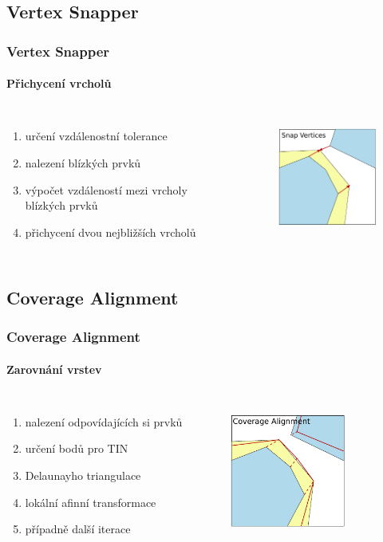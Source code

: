 \documentclass[unicode,bookmarksnumbered]{beamer}
\begin{document}
  \subsection{Vertex Snapper}  %
  \begin{frame}
  \frametitle{Vertex Snapper}
    \framesubtitle{Přichycení vrcholů}
    \begin{columns}[c]
	\column{2in}
	\begin{enumerate}
	   \item určení vzdálenostní tolerance
	   \item nalezení blízkých prvků
	   \item výpočet vzdáleností mezi vrcholy blízkých prvků
	   \item přichycení dvou nejbližších vrcholů
	\end{enumerate}
	\column{2in}
	  \begin{figure}
	  \centering
             \includegraphics[width=1.5in]{./pictures/snap.pdf}
	  \label{fig:vs-princip}
	  \end{figure}
      \end{columns}
  \end{frame}

  \subsection{Coverage Alignment} %
  \begin{frame}
  \frametitle{Coverage Alignment}
    \framesubtitle{Zarovnání vrstev}
    \begin{columns}[c]
	\column{2in}
	\begin{enumerate}
	   \item nalezení odpovídajících si prvků
	   \item určení bodů pro TIN
	   \item Delaunayho triangulace 
	   \item lokální afinní transformace
	   \item případně další iterace
	\end{enumerate}
	\column{2in}
	  \begin{figure}
	  \centering
             \includegraphics[width=1.5in]{./pictures/align.pdf}
	  \label{fig:ca-princip}
	  \end{figure}
      \end{columns}
  \end{frame}
\end{document}
